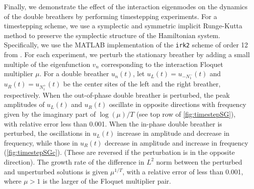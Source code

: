 \documentclass[12pt,reqno]{amsart}
\theoremstyle{definition}
\begin{document}
Finally, we demonstrate the effect of the interaction eigenmodes on the dynamics of the double breathers by performing timestepping experiments. For a timestepping scheme, we use a symplectic and symmetric implicit Runge-Kutta method \cite{HairerBook} to preserve the symplectic structure of the Hamiltonian system. Specifically, we use the MATLAB implementation of the \texttt{irk2} scheme of order 12 from \cite{Hairer2003}.
For each experiment, we perturb the stationary breather by adding a small multiple of the eigenfunction $v_n$ corresponding to the interaction Floquet multiplier $\mu$. For a double breather $u_n(t)$, let $u_L(t) = u_{-N_1^-}(t)$ and $u_R(t) = u_{N_1^+}(t)$ be the center sites of the left and the right breather, respectively. When the out-of-phase double breather is perturbed, the peak amplitudes of $u_L(t)$ and $u_R(t)$ oscillate in opposite directions with frequency given by the imaginary part of $\log(\mu)/T$ (see top row of \cref{fig:timestepSG}), with relative error less than 0.001. When the in-phase double breather is perturbed, the oscillations in $u_L(t)$ increase in amplitude and decrease in frequency, while those in $u_R(t)$ decrease in amplitude and increase in frequency (\cref{fig:timestepSGc}). (These are reversed if the perturbation is in the opposite direction). The growth rate of the difference in $L^2$ norm between the perturbed and unperturbed solutions is given $\mu^{1/T}$, with a relative error of less than 0.001, where $\mu > 1$ is the larger of the Floquet multiplier pair.
\end{document}
